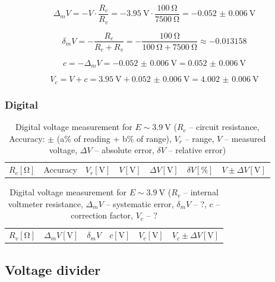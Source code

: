 \begin{equation}
	\Delta_m V = -V\cdot\frac{R_c}{R_v} = -\SI{3.95}{\volt}\cdot\frac{\SI{100}{\ohm}}{\SI{7500}{\ohm}} = -\SI{0.052(6)}{\volt}
	\label{eq:analog_Delta_m}
\end{equation}

\begin{equation}
	\delta_m V = -\frac{R_c}{R_c + R_v} = -\frac{\SI{100}{\ohm}}{\SI{100}{\ohm} + \SI{7500}{\ohm}} \approx -0.013158
	\label{eq:analog_delta_m}
\end{equation}

\begin{equation}
	c = -\Delta_m V = -\SI{0.052(6)}{\volt} = \SI{0.052(6)}{\volt}
	\label{eq:analog_c}
\end{equation}

\begin{equation}
	V_c = V + c = \SI{3.95}{\volt} + \SI{0.052(6)}{\volt} = \SI{4.002(6)}{\volt}
	\label{eq:analog_V_c}
\end{equation}


\subsubsection*{Digital}

\begin{table}[H]
	\centering
	\begin{tabular}{ c | c |  c | c | c | c | c}
		$R_c [\unit{\ohm}]$  & Accuracy & $V_r [\unit{\volt}]$ & $V [\unit{\volt}]$ & $\Delta V [\unit{\volt}]$ & $\delta V [\unit{\percent}]$ & $V \pm \Delta V [\unit{\volt}]$ \\
	\end{tabular}
	\caption{Digital voltage measurement for $E \sim \SI{3.9}{\volt}$ ($R_c$ -- circuit resistance, Accuracy: $\pm$ (a$\unit{\percent}$ of reading + b$\unit{\percent}$ of range), $V_r$ -- range, $V$ -- measured voltage, $\Delta V$ -- absolute error, $\delta V$ -- relative error)}
	\label{tab:digital_voltage_1}
\end{table}

\begin{table}[H]
	\centering
	\begin{tabular}{  c | c | c | c | c | c}
	 $R_v [\unit{\ohm}]$ & $\Delta_m V [\unit{\volt}]$ & $\delta_m V$ & $c [\unit{\volt}]$ & $V_c [\unit{\volt}]$ & $V_c \pm \Delta V [\unit{\volt}]$\\
	\end{tabular}
	\caption{Digital voltage measurement for $E \sim \SI{3.9}{\volt}$ ($R_v$ -- internal voltmeter resistance, $\Delta_m V$ -- systematic error, $\delta_m V$ -- ?, $c$ -- correction factor, $V_c$ -- ?}
	\label{tab:digital_voltage_2}
\end{table}

\subsection{Voltage divider}